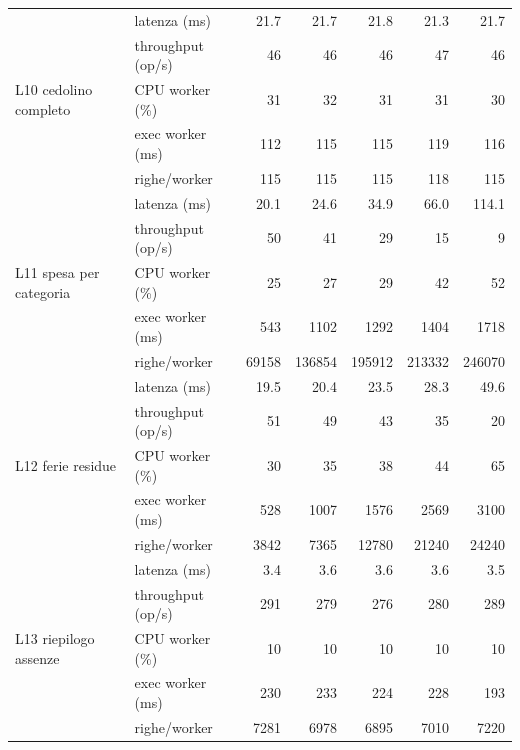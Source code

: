 \begin{longtable}{@{}llrrrrr@{}}
\multirow{5}{*}{L10 cedolino completo} & latenza (ms)     & 21.7 & 21.7 & 21.8 & 21.3 & 21.7 \\
 & throughput (op/s) & 46 & 46 & 46 & 47 & 46 \\
 & CPU worker (\%)   & 31 & 32 & 31 & 31 & 30 \\
 & exec worker (ms)  & 112 & 115 & 115 & 119 & 116 \\
 & righe/worker      & 115 & 115 & 115 & 118 & 115 \\ \midrule
\multirow{5}{*}{L11 spesa per categoria} & latenza (ms)     & 20.1 & 24.6 & 34.9 & 66.0 & 114.1 \\
 & throughput (op/s) & 50 & 41 & 29 & 15 & 9 \\
 & CPU worker (\%)   & 25 & 27 & 29 & 42 & 52 \\
 & exec worker (ms)  & 543 & 1102 & 1292 & 1404 & 1718 \\
 & righe/worker      & 69158 & 136854 & 195912 & 213332 & 246070 \\ \midrule
\multirow{5}{*}{L12 ferie residue} & latenza (ms)     & 19.5 & 20.4 & 23.5 & 28.3 & 49.6 \\
 & throughput (op/s) & 51 & 49 & 43 & 35 & 20 \\
 & CPU worker (\%)   & 30 & 35 & 38 & 44 & 65 \\
 & exec worker (ms)  & 528 & 1007 & 1576 & 2569 & 3100 \\
 & righe/worker      & 3842 & 7365 & 12780 & 21240 & 24240 \\ \midrule
\multirow{5}{*}{L13 riepilogo assenze} & latenza (ms)     & 3.4 & 3.6 & 3.6 & 3.6 & 3.5 \\
 & throughput (op/s) & 291 & 279 & 276 & 280 & 289 \\
 & CPU worker (\%)   & 10 & 10 & 10 & 10 & 10 \\
 & exec worker (ms)  & 230 & 233 & 224 & 228 & 193 \\
 & righe/worker      & 7281 & 6978 & 6895 & 7010 & 7220 \\ \midrule
\bottomrule
\end{longtable}
\endgroup
